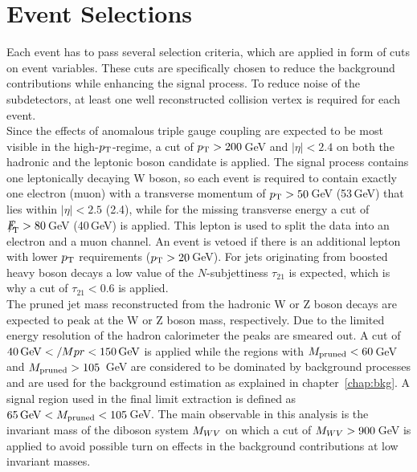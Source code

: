 \section{Event Selections}
\label{sec:eventselection}
Each event has to pass several selection criteria, which are applied in form of cuts on event variables. These cuts are specifically chosen to reduce the background contributions while enhancing the signal process. To reduce noise of the subdetectors, at least one well reconstructed collision vertex is required for each event.\\

\noindent Since the effects of anomalous triple gauge coupling are expected to be most visible in the high-$p_{\rm T}$-regime, a cut of $p_{\rm T}>200$\,GeV and $|\eta|<2.4$ on both the hadronic and the leptonic boson candidate is applied. The signal process contains one leptonically decaying W boson, so each event is required to contain exactly one electron (muon) with a transverse momentum of $p_{\rm T}>50$\,GeV (53\,GeV) that lies within $|\eta|<2.5$ (2.4), while for the missing transverse energy a cut of ${E\!\!\!\!/}_{\!\mathrm{T}} >80$\,GeV (40\,GeV) is applied. This lepton is used to split the data into an electron and a muon channel. An event is vetoed if there is an additional lepton with lower $p_{\rm T}$ requirements ($p_{\rm T}>20$\,GeV).  For jets originating from boosted heavy boson decays a low value of the $N$-subjettiness $\tau_{21}$ is expected, which is why a cut of $\tau_{21}<0.6$ is applied.\\

\noindent The pruned jet mass reconstructed from the hadronic W or Z boson decays are expected to peak at the W or Z boson mass, respectively. Due to the limited energy resolution of the hadron calorimeter the peaks are smeared out. A cut of $40\,{\rm GeV}</Mpr<150\,{\rm GeV}$ is applied while the regions with $M_\mathrm{pruned}<60$\,GeV and $M_\mathrm{pruned}>105$\, GeV are considered to be dominated by background processes and are used for the background estimation as explained in chapter~\ref{chap:bkg}. A signal region used in the final limit extraction is defined as $65\,{\rm GeV}<M_\mathrm{pruned}<105$\,GeV. The main observable in this analysis is the invariant mass of the diboson system $M_{WV}$ on which a cut of $M_{WV}>900$\,GeV is applied to avoid possible turn on effects in the background contributions at low invariant masses.

